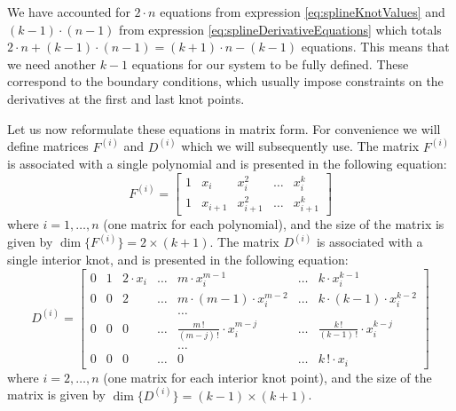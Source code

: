 \documentclass[12pt, a4paper]{article}
\begin{document}
We have accounted for \( 2\cdot n \) equations from expression \eqref{eq:splineKnotValues} and \( (k-1) \cdot (n-1) \) from expression \eqref{eq:splineDerivativeEquations} which totals \( 2 \cdot n + (k-1) \cdot (n-1) = (k+1) \cdot n - (k-1)\) equations. This means that we need another \( k-1 \) equations for our system to be fully defined. These correspond to the boundary conditions, which usually impose constraints on the derivatives at the first and last knot points.\par
Let us now reformulate these equations in matrix form. For convenience we will define matrices \( F^{(i)} \) and \( D^{(i)}\) which we will subsequently use. The matrix \( F^{(i)} \) is associated with a single polynomial and is presented in the following equation:
\begin{equation} \label{eq:splineMatrixF}
    F^{(i)} = 
    \begin{bmatrix}
    1 & x_i & x_i^2 & \ldots & x_i^k \\
    1 & x_{i+1} & x_{i+1}^2 & \ldots & x_{i+1}^k
    \end{bmatrix}
\end{equation}
\noindent where \( i = 1,\ldots, n \) (one matrix for each polynomial), and the size of the matrix is given by \( \dim \{F^{(i)}\} = 2\times(k+1)\). The matrix \( D^{(i)}\) is associated with a single interior knot, and is presented in the following equation: 
\begin{equation} \label{eq:splineMatrixD}
    D^{(i)} = 
    \begin{bmatrix}
    0 & 1 & 2 \cdot x_i & \ldots & m \cdot x_i^{m-1} & \dots & k \cdot x_i^{k-1} \\
    0 & 0 & 2           & \ldots & m \cdot (m-1) \cdot x_i^{m-2} & \dots & k \cdot (k-1) \cdot x_i^{k-2} \\
      &   &             &        & \ldots                        &       &                                \\
    0 & 0 & 0           & \ldots & \frac{m\,!}{(m-j)\,!} \cdot x_i^{m-j} & \dots & \frac{k\,!}{(k-1)\,!} \cdot x_i^{k-j} \\
      &   &             &        & \ldots                        &       &                                \\
    0 & 0 & 0           & \ldots & 0 & \dots & k\,! \cdot x_i
    \end{bmatrix}
\end{equation}
\noindent where \( i = 2,\ldots, n \) (one matrix for each interior knot point), and the size of the matrix is given by \( \dim \{D^{(i)}\} = (k-1)\times(k+1)\).\par
\end{document}
